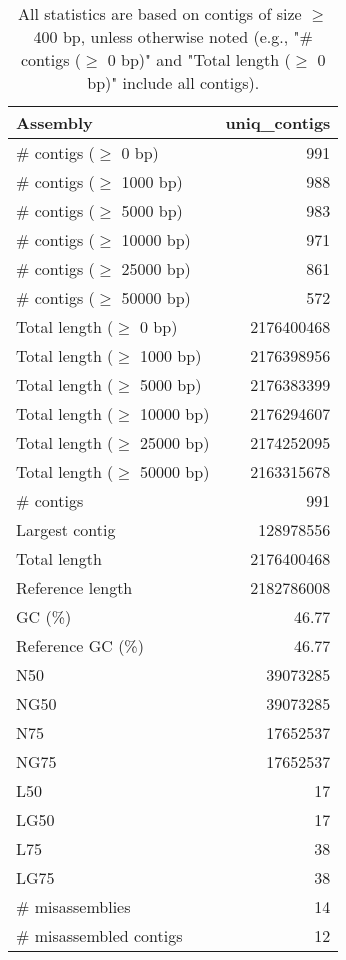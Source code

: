 \documentclass[12pt,a4paper]{article}
\begin{document}
\begin{table}[ht]
\begin{center}
\caption{All statistics are based on contigs of size $\geq$ 400 bp, unless otherwise noted (e.g., "\# contigs ($\geq$ 0 bp)" and "Total length ($\geq$ 0 bp)" include all contigs).}
\begin{tabular}{|l*{1}{|r}|}
\hline
Assembly & uniq\_contigs \\ \hline
\# contigs ($\geq$ 0 bp) & 991 \\ \hline
\# contigs ($\geq$ 1000 bp) & 988 \\ \hline
\# contigs ($\geq$ 5000 bp) & 983 \\ \hline
\# contigs ($\geq$ 10000 bp) & 971 \\ \hline
\# contigs ($\geq$ 25000 bp) & 861 \\ \hline
\# contigs ($\geq$ 50000 bp) & 572 \\ \hline
Total length ($\geq$ 0 bp) & 2176400468 \\ \hline
Total length ($\geq$ 1000 bp) & 2176398956 \\ \hline
Total length ($\geq$ 5000 bp) & 2176383399 \\ \hline
Total length ($\geq$ 10000 bp) & 2176294607 \\ \hline
Total length ($\geq$ 25000 bp) & 2174252095 \\ \hline
Total length ($\geq$ 50000 bp) & 2163315678 \\ \hline
\# contigs & 991 \\ \hline
Largest contig & 128978556 \\ \hline
Total length & 2176400468 \\ \hline
Reference length & 2182786008 \\ \hline
GC (\%) & 46.77 \\ \hline
Reference GC (\%) & 46.77 \\ \hline
N50 & 39073285 \\ \hline
NG50 & 39073285 \\ \hline
N75 & 17652537 \\ \hline
NG75 & 17652537 \\ \hline
L50 & 17 \\ \hline
LG50 & 17 \\ \hline
L75 & 38 \\ \hline
LG75 & 38 \\ \hline
\# misassemblies & 14 \\ \hline
\# misassembled contigs & 12 \\ \hline

\end{tabular}
\end{center}
\end{table}
\end{document}
